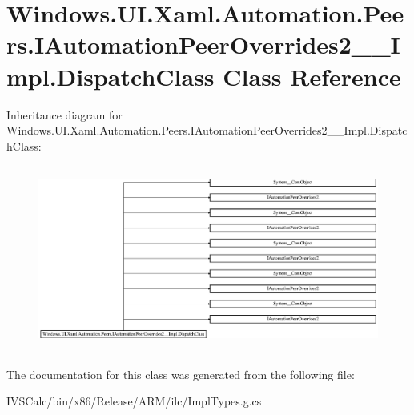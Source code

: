 \hypertarget{class_windows_1_1_u_i_1_1_xaml_1_1_automation_1_1_peers_1_1_i_automation_peer_overrides2_____impl_1_1_dispatch_class}{}\section{Windows.\+U\+I.\+Xaml.\+Automation.\+Peers.\+I\+Automation\+Peer\+Overrides2\+\_\+\+\_\+\+Impl.\+Dispatch\+Class Class Reference}
\label{class_windows_1_1_u_i_1_1_xaml_1_1_automation_1_1_peers_1_1_i_automation_peer_overrides2_____impl_1_1_dispatch_class}
Inheritance diagram for Windows.\+U\+I.\+Xaml.\+Automation.\+Peers.\+I\+Automation\+Peer\+Overrides2\+\_\+\+\_\+\+Impl.\+Dispatch\+Class\+:\begin{figure}[H]
\begin{center}
\leavevmode
\includegraphics[height=6.160000cm]{class_windows_1_1_u_i_1_1_xaml_1_1_automation_1_1_peers_1_1_i_automation_peer_overrides2_____impl_1_1_dispatch_class}
\end{center}
\end{figure}


The documentation for this class was generated from the following file\+:\begin{DoxyCompactItemize}
\item 
I\+V\+S\+Calc/bin/x86/\+Release/\+A\+R\+M/ilc/Impl\+Types.\+g.\+cs\end{DoxyCompactItemize}
